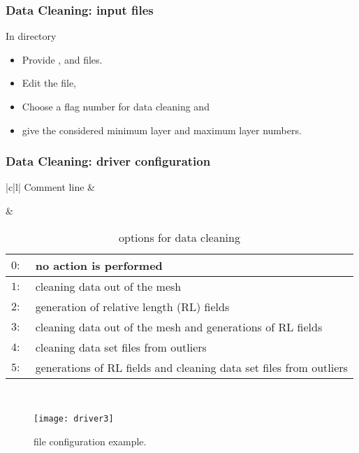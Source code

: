 
\begin{frame}
\frametitle{Data Cleaning: input files}

\centerline{In  directory}

\begin{itemize}
\item Provide ,  and  files.
\end{itemize}
\begin{itemize}
\item Edit the  file,
\item Choose a flag number for data cleaning and
\item give the considered minimum layer and maximum layer numbers.
\end{itemize}

\end{frame}


\begin{frame}
\frametitle{Data Cleaning: driver configuration}

\begin{table}
\centering
\caption{ options for data cleaning}
\tiny{
\begin{tabular}{|c|l|}
\hline 
{ { Comment line}}
 & 
\\ \hline  \hline  
 
&
\begin{tabular}{r|l}
{\sf $0:\ $ } & {\sf no action is performed} \\ \hline
{\sf $1:\ $ } & {\sf cleaning data out of the mesh} \\ \hline
{\sf $2:\ $ } & {\sf generation of relative length (RL) fields} \\ \hline
{\sf $3:\ $ } & {\sf cleaning data out of the mesh and generations of RL fields} \\ \hline
{\sf $4:\ $ } & {\sf cleaning data set files from outliers} \\ \hline
{\sf $5:\ $} & {\sf  generations of RL fields and cleaning data set files from outliers}
\end{tabular} 
\\ \hline 
\end{tabular}
}\end{table}

\vspace{-0.3cm}

\begin{figure}
\centering
\texttt{[image: driver3]}
\caption{ file configuration example.}
\end{figure}
\end{frame}

